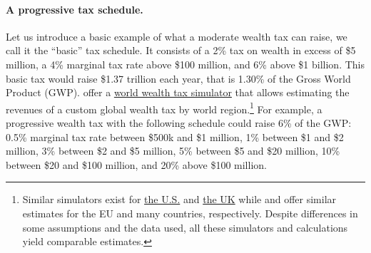 \documentclass[12pt,english]{article}
\begin{document}
\paragraph{A progressive tax schedule.} %
Let us introduce a basic example of what a moderate wealth tax can raise, we call it the ``basic'' tax schedule. It consists of a 2\% tax on wealth in excess of \$5 million, a 4\% marginal tax rate above \$100 million, and 6\% above \$1 billion. This basic tax would raise \$1.37 trillion each year, that is 1.30\% of the Gross World Product (GWP). %
\citet{chancel_world_2022} offer a \href{https://wid.world/world-wealth-tax-simulator/}{world wealth tax simulator} that allows estimating the revenues of a custom global wealth tax by world region.\footnote{Similar simulators exist for \href{https://taxjusticenow.org/}{the U.S.} \citep{saez_triumph_2019} and \href{http://taxsimulator.ukwealth.tax/\#/appendix}{the UK} while \citet{kapeller_european_2021} and \citet{oxfam_taxing_2022} offer similar estimates for the EU and many countries, respectively. Despite differences in some assumptions and the data used, all these simulators and calculations yield comparable estimates.} 
For example, a progressive wealth tax with the following schedule could raise 6\% of the GWP: 0.5\% marginal tax rate between \$500k and \$1 million, 1\% between \$1 and \$2 million, 3\% between \$2 and \$5 million, 5\% between \$5 and \$20 million, 10\% between \$20 and \$100 million, and 20\% above \$100 million. %
\end{document}
